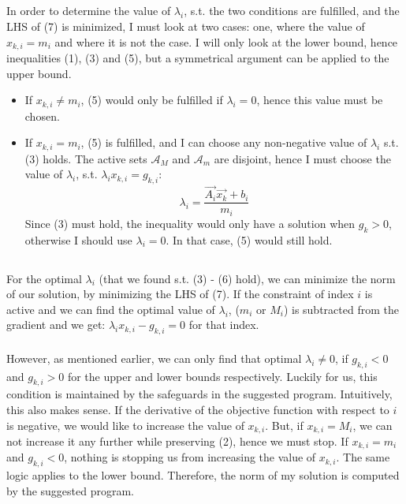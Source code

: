 \documentclass[a4paper]{article}
\begin{document}
\subsection{}
In order to determine the value of $\lambda_i$, s.t. the two conditions are
fulfilled, and the LHS of (7) is minimized, I must look at two cases: one, where
the value of $x_{k,i} = m_i$ and where it is not the case. I will
only look at the lower bound, hence inequalities (1), (3) and (5), but a
symmetrical argument can be applied to the upper bound.
\begin{itemize}
\item If $x_{k,i} \neq m_i$, (5) would only be fulfilled if $\lambda_i = 0$,
  hence this value must be chosen.
\item If $x_{k,i} = m_i$, (5) is fulfilled, and I can choose any non-negative
  value of $\lambda_i$ s.t. (3) holds. The active sets
  $\mathcal{A}_M$ and $\mathcal{A}_m$ are disjoint, hence I must choose the
  value of $\lambda_i$, s.t. $\lambda_i x_{k,i} = g_{k,i}$:
  \[
    \lambda_i = \frac{\vec{A_i} \vec{x_k} + b_i}{m_i}
  \]
  Since (3) must hold, the inequality would only have a solution when $g_k > 0$,
  otherwise I should use $\lambda_i = 0$. In that case, (5) would still hold.
\end{itemize}

\subsection{}
For the optimal $\lambda_i$ (that we found s.t. (3) - (6) hold), we can minimize
the norm of our solution, by minimizing the LHS of (7).
If the constraint of index $i$ is active and we can find the optimal value of
$\lambda_i$, ($m_i$ or $M_i$) is subtracted from the gradient and we get:
$\lambda_i x_{k,i} - g_{k,i} = 0$ for that index.\\\\
However, as mentioned earlier,
we can only find that optimal $\lambda_i \neq 0$, if $g_{k,i} < 0$ and
$g_{k,i} > 0$ for the upper and lower bounds respectively. Luckily for us, this
condition is maintained by the safeguards in the suggested program. Intuitively,
this also makes sense. If the derivative of the objective function with respect
to $i$ is negative, we would like to increase the value of $x_{k,i}$. But, if
$x_{k,i} = M_i$, we can not increase it any further while preserving (2), hence
we must stop. If $x_{k,i} = m_i$ and $g_{k,i} < 0$, nothing is stopping us from
increasing the value of $x_{k,i}$. The same logic applies to the lower bound.
Therefore, the norm of my solution is computed by the suggested program.
\end{document}

